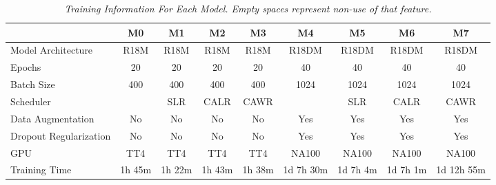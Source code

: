 \documentclass[dvipsnames,mathserif]{beamer}
\begin{document}
{\begin{frame}
\begin{table}
    \centering
    \begin{adjustbox}{width=\textwidth}
    \begin{tabular}{lcccccccc}
      \toprule
      & \textbf{M0} & \textbf{M1} & \textbf{M2} & \textbf{M3} & \textbf{M4} & \textbf{M5} & \textbf{M6} & \textbf{M7} \\
      \midrule
      Model Architecture & R18M & R18M & R18M & R18M & R18DM & R18DM & R18DM & R18DM \\
      Epochs & 20 & 20 & 20 & 20 & 40 & 40 & 40 & 40 \\
      Batch Size & 400 & 400 & 400 & 400 & 1024 & 1024 & 1024 & 1024 \\
      Scheduler & & SLR & CALR & CAWR &  & SLR & CALR & CAWR  \\
      Data Augmentation & No & No & No & No  & Yes & Yes & Yes & Yes \\
      Dropout Regularization & No & No & No & No  & Yes & Yes & Yes & Yes \\
      GPU & TT4 & TT4 & TT4 & TT4 & NA100 & NA100 & NA100 & NA100 \\
      Training Time & 1h 45m & 1h 22m & 1h 43m & 1h 38m & 1d 7h 30m & 1d 7h 4m & 1d 7h 1m & 1d 12h 55m \\ \bottomrule
    \end{tabular}
  \end{adjustbox}
    \caption[Training Information For Each Model.]
    {\textit{\footnotesize{Training Information For Each Model. Empty spaces represent non-use of that feature.}}}
    {\label{table:trained-models-information}}
  \end{table}

    \end{frame}


    \begin{frame}


\end{frame}}
\end{document}
